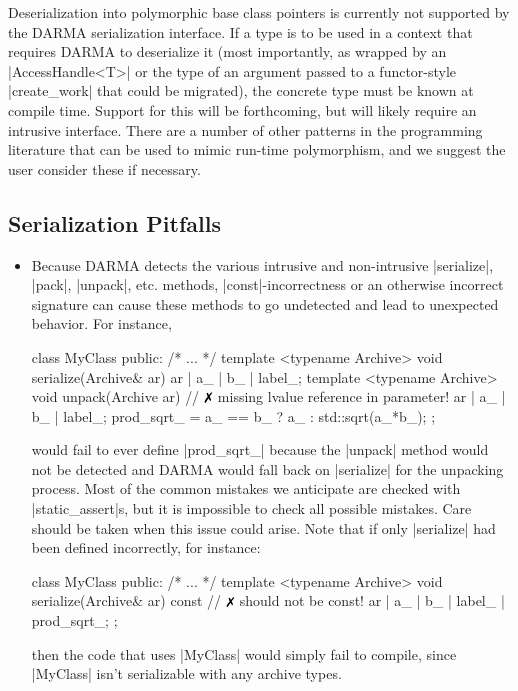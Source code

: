 Deserialization into polymorphic base class pointers is currently not supported
by the DARMA serialization interface.  If a type is to be used in a context that
requires DARMA to deserialize it (most importantly, as wrapped by an
|AccessHandle<T>| or the type of an argument passed to a
functor-style |create_work| that could be migrated), the concrete type must be
known at compile time.  Support for this will be forthcoming, but will likely require an intrusive interface.  
There are a number of other patterns in the programming
literature that can be used to mimic run-time polymorphism, and we suggest the
user consider these if necessary.

\subsection{Serialization Pitfalls}

\begin{itemize}
  \item Because DARMA detects the various intrusive and non-intrusive
  |serialize|, |pack|, |unpack|, etc. methods, |const|-incorrectness or an
  otherwise incorrect signature can cause these methods to go undetected and
  lead to unexpected behavior.  For instance,
\begin{CppCodeNumb}
class MyClass {
  public:
    /* ... */
    template <typename Archive>
    void serialize(Archive& ar) {
      ar | a_ | b_ | label_;
    }
    template <typename Archive>
    void unpack(Archive ar) { // $\no$ missing lvalue reference in parameter!
      ar | a_ | b_ | label_;
      prod_sqrt_ = a_ == b_ ? a_ : std::sqrt(a_*b_);
    }
};
\end{CppCodeNumb}
would fail to ever define |prod_sqrt_| because the |unpack| method would not be
detected and DARMA would fall back on |serialize| for the unpacking process. 
Most of the common mistakes we anticipate are checked with |static_assert|s, but
it is impossible to check all possible mistakes.  Care should be taken when this
issue could arise.  Note that if only |serialize| had been defined incorrectly,
for instance:
\begin{CppCodeNumb}
class MyClass {
  public:
    /* ... */
    template <typename Archive>
    void serialize(Archive& ar) const { // $\no$ should not be const!
      ar | a_ | b_ | label_ | prod_sqrt_;
    }
};
\end{CppCodeNumb}
then the code that uses |MyClass| would simply fail to compile, since |MyClass|
isn't serializable with any archive types.
\end{itemize}

\lstDeleteShortInline{\|}
